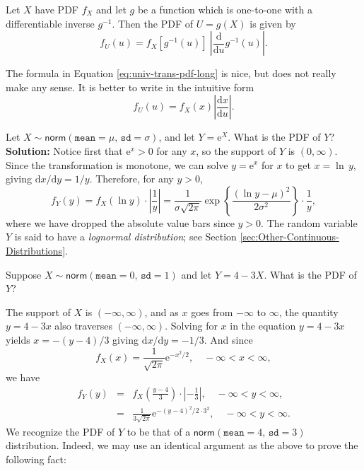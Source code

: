 \documentclass[captions=tableheading]{scrbook}
\begin{document}
\label{pro:func-cont-rvs-pdf-formula}
\begin{prop}
Let \(X\) have PDF \(f_{X}\) and let \(g\) be a function which is one-to-one with a differentiable inverse \(g^{-1}\). Then the PDF of \(U=g(X)\) is given by
\begin{equation}
f_{U}(u)=f_{X}\left[g^{-1}(u)\right]\ \left|\frac{\mathrm{d}}{\mathrm{d} u}g^{-1}(u)\right|.\label{eq:univ-trans-pdf-long}
\end{equation}
\end{prop}

\begin{rem}
The formula in Equation \ref{eq:univ-trans-pdf-long} is nice, but does not really make any sense. It is better to write in the intuitive form
\begin{equation}
f_{U}(u)=f_{X}(x)\left|\frac{\mathrm{d} x}{\mathrm{d} u}\right|.\label{eq:univ-trans-pdf-short}
\end{equation}
\end{rem}


\begin{example}
\label{exa:lnorm-transformation}
Let \(X\sim\mathsf{norm}(\mathtt{mean}=\mu,\,\mathtt{sd}=\sigma)\), and let \(Y=\mathrm{e}^{X}\). What is the PDF of \(Y\)? 
\textbf{Solution:} Notice first that \(\mathrm{e}^{x}>0\) for any \(x\), so the support of \(Y\) is \((0,\infty)\). Since the transformation is monotone, we can solve \(y=\mathrm{e}^{x}\) for \(x\) to get \(x=\ln\, y\), giving \(\mathrm{d} x/\mathrm{d} y=1/y\). Therefore, for any \(y>0\),
\[
f_{Y}(y)=f_{X}(\ln y)\cdot\left|\frac{1}{y}\right|=\frac{1}{\sigma\sqrt{2\pi}}\exp\left\{ \frac{(\ln y-\mu)^{2}}{2\sigma^{2}}\right\} \cdot\frac{1}{y},
\]
where we have dropped the absolute value bars since \(y>0\). The random variable \(Y\) is said to have a \emph{lognormal distribution}; see Section \ref{sec:Other-Continuous-Distributions}.
\end{example}

\begin{example}
\label{exa:lin-trans-norm}
Suppose \(X\sim\mathsf{norm}(\mathtt{mean}=0,\,\mathtt{sd}=1)\) and let \(Y=4-3X\). What is the PDF of \(Y\)?
\end{example}

The support of \(X\) is \((-\infty,\infty)\), and as \(x\) goes from \(-\infty\) to \(\infty\), the quantity \(y=4-3x\) also traverses \((-\infty,\infty)\). Solving for \(x\) in the equation \(y=4-3x\) yields \(x=-(y-4)/3\) giving \(\mathrm{d} x/\mathrm{d} y=-1/3\). And since
\[
f_{X}(x)=\frac{1}{\sqrt{2\pi}}\mathrm{e}^{-x^{2}/2},\quad-\infty<x<\infty,
\]
we have
\begin{eqnarray*}
f_{Y}(y) & = & f_{X}\left(\frac{y-4}{3}\right)\cdot\left|-\frac{1}{3}\right|,\quad-\infty<y<\infty,\\
 & = & \frac{1}{3\sqrt{2\pi}}\mathrm{e}^{-(y-4)^{2}/2\cdot3^{2}},\quad-\infty<y<\infty.
\end{eqnarray*}
We recognize the PDF of \(Y\) to be that of a \(\mathsf{norm}(\mathtt{mean}=4,\,\mathtt{sd}=3)\) distribution. Indeed, we may use an identical argument as the above to prove the following fact:
\end{document}
